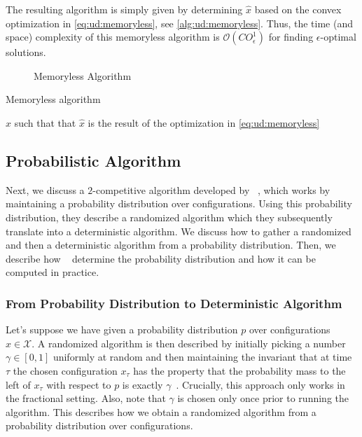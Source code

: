 The resulting algorithm is simply given by determining $\hat{x}$ based on the convex optimization in \cref{eq:ud:memoryless}, see \cref{alg:ud:memoryless}. Thus, the time (and space) complexity of this memoryless algorithm is $\mathcal{O}(C O_{\epsilon}^1)$ for finding $\epsilon$-optimal solutions.

\begin{figure}

    \caption{Memoryless Algorithm}
    \label{fig:memoryless_algorithm}
\end{figure}

\begin{algorithm}
    \caption{Memoryless algorithm~\cite{Bansal2015}}\label{alg:ud:memoryless}
    \Return $\hat{x}$ such that that $\hat{x}$ is the result of the optimization in \cref{eq:ud:memoryless}\;
\end{algorithm}

\subsection{Probabilistic Algorithm}\label{section:online_algorithms:ud:probabilistic}

Next, we discuss a $2$-competitive algorithm developed by \citeauthor*{Bansal2015}~\cite{Bansal2015}, which works by maintaining a probability distribution over configurations. Using this probability distribution, they describe a randomized algorithm which they subsequently translate into a deterministic algorithm. We discuss how to gather a randomized and then a deterministic algorithm from a probability distribution. Then, we describe how \citeauthor*{Bansal2015}~\cite{Bansal2015} determine the probability distribution and how it can be computed in practice.

\subsubsection{From Probability Distribution to Deterministic Algorithm}

Let's suppose we have given a probability distribution $p$ over configurations $x \in \mathcal{X}$. A randomized algorithm is then described by initially picking a number $\gamma \in [0,1]$ uniformly at random and then maintaining the invariant that at time $\tau$ the chosen configuration $x_{\tau}$ has the property that the probability mass to the left of $x_{\tau}$ with respect to $p$ is exactly $\gamma$~\cite{Bansal2015}. Crucially, this approach only works in the fractional setting. Also, note that $\gamma$ is chosen only once prior to running the algorithm. This describes how we obtain a randomized algorithm from a probability distribution over configurations.

